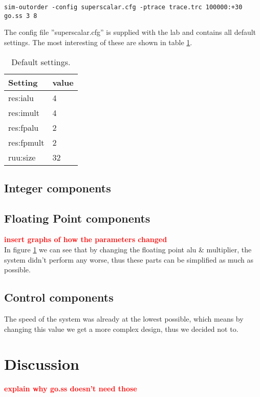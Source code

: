 \documentclass[titlepage, a4paper]{article}
\newcommand{\todo}[1] {\textbf{\textcolor{red}{#1}}}
\begin{document}
\begin{lstlisting}[caption=Simulator command., label=sim:simcom, breaklines=true]
sim-outorder -config superscalar.cfg -ptrace trace.trc 100000:+30 go.ss 3 8
\end{lstlisting}

The config file ''superscalar.cfg'' is supplied with the lab and contains all default settings. The most interesting of these are shown in table \ref{tab:default}.

\begin{table}[H]
\centering
\caption{Default settings.}

\begin{tabular}{|l|l|}
  \hline
  \textbf{Setting} & \textbf{value} \\ \hline
  res:ialu & 4 \\ \hline
  res:imult & 4 \\ \hline
  res:fpalu & 2 \\ \hline
  res:fpmult & 2 \\ \hline
  ruu:size & 32 \\ \hline
\end{tabular}

\label{tab:default}
\end{table}


\subsection{Integer components}



\subsection{Floating Point components}
\todo{insert graphs of how the parameters changed} \\
In figure \ref{} we can see that by changing the floating point alu \& multiplier, the system didn't perform any worse, thus these parts can be simplified as much as possible.


\subsection{Control components}
The speed of the system was already at the lowest possible, which means by changing this value we get a more complex design, thus we decided not to.



\section{Discussion}
\todo{explain why go.ss doesn't need those} \\
\end{document}
